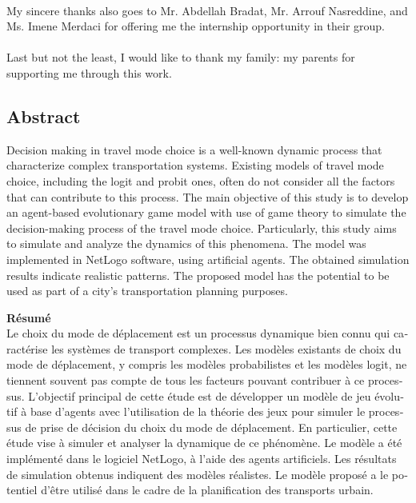 \documentclass[12pt]{report}
\begin{document}
\paragraph{}
My sincere thanks also goes to Mr. Abdellah Bradat, Mr. Arrouf Nasreddine, and Ms. Imene Merdaci for offering me the internship opportunity in their group.
\paragraph{}
Last but not the least, I would like to thank my family: my parents for supporting me through this work. 
\clearpage
\begin{center}


\section*{Abstract}


Decision making in travel mode choice is a well-known dynamic process that characterize complex transportation systems. Existing models of travel mode choice, including the logit and probit ones, often do not consider all the factors that can contribute to this process. The main objective of this study is to develop an agent-based evolutionary game model with use of game theory to simulate the decision-making process of the travel mode choice. Particularly, this study aims to simulate and analyze the dynamics of this phenomena. The model was implemented in NetLogo software, using artificial agents. The obtained simulation results indicate realistic patterns. The proposed model has the potential to be used as part of a city's transportation planning purposes.
\\
\vspace{0.2cm}
   \begin{otherlanguage}{french}
   \textbf{Résumé}\\
   \vspace{0.2cm}
Le choix du mode de déplacement est un processus dynamique bien connu qui caractérise les systèmes de transport complexes. Les modèles existants de choix du mode de déplacement, y compris les modèles probabilistes et les modèles logit, ne tiennent souvent pas compte de tous les facteurs pouvant contribuer à ce processus. L'objectif principal de cette étude est de développer un modèle de jeu évolutif à base d'agents avec l'utilisation de la théorie des jeux pour simuler le processus de prise de décision du choix du mode de déplacement. En particulier, cette étude vise à simuler et analyser la dynamique de ce phénomène. Le modèle a été implémenté dans le logiciel NetLogo, à l'aide des agents artificiels. Les résultats de simulation obtenus indiquent des modèles réalistes. Le modèle proposé a le potentiel d'être utilisé dans le cadre de la planification des transports urbain.
\vspace{0.2cm}
\end{otherlanguage}
  \\
  

\end{center}
\end{document}
